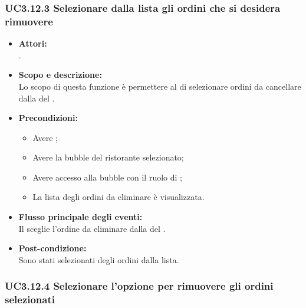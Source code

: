 \subsubsection{UC3.12.3 Selezionare dalla lista gli ordini che si desidera rimuovere} \label{UC3.12.3}

\begin{itemize}
	\item \textbf{Attori:}
	\\.
	\item \textbf{Scopo e descrizione:} 
	\\Lo scopo di questa funzione è permettere al  di selezionare ordini da cancellare dalla  del .
	\item \textbf{Precondizioni:}
	\begin{itemize}
		\item Avere ;
		\item Avere la bubble del ristorante selezionato;
		\item Avere accesso alla bubble con il ruolo di ;
		\item La lista degli ordini da eliminare è visualizzata.
	\end{itemize}
	\item \textbf{Flusso principale degli eventi:}
	\\Il {} sceglie l’ordine da eliminare dalla  del .
	\item \textbf{Post-condizione:}
	\\Sono stati selezionati degli ordini dalla lista.
\end{itemize}

\subsubsection{UC3.12.4 Selezionare l’opzione per rimuovere gli ordini selezionati} \label{UC3.12.4}

